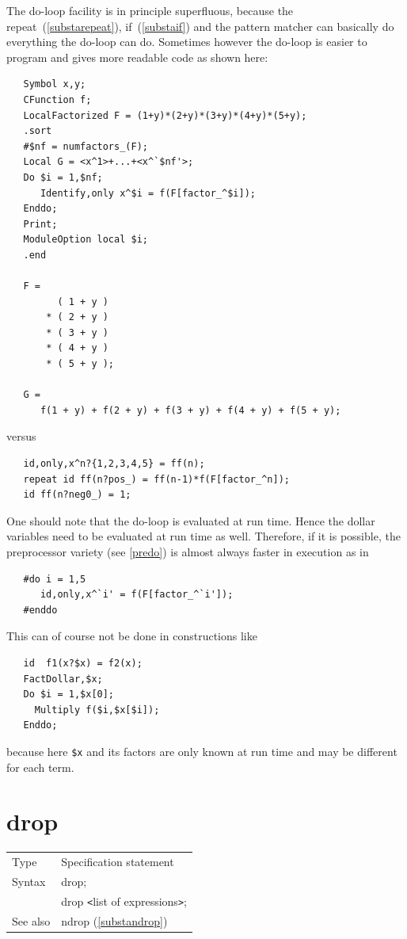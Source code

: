 \noindent The do-loop facility is in principle superfluous, because the 
repeat~(\ref{substarepeat}), if~(\ref{substaif}) and the pattern matcher can 
basically do everything the do-loop can do. Sometimes however the do-loop 
is easier to program and gives more readable code as shown here:
\begin{verbatim}
   Symbol x,y;
   CFunction f;
   LocalFactorized F = (1+y)*(2+y)*(3+y)*(4+y)*(5+y);
   .sort
   #$nf = numfactors_(F);
   Local G = <x^1>+...+<x^`$nf'>;
   Do $i = 1,$nf;
      Identify,only x^$i = f(F[factor_^$i]);
   Enddo;
   Print;
   ModuleOption local $i;
   .end

   F =
         ( 1 + y )
       * ( 2 + y )
       * ( 3 + y )
       * ( 4 + y )
       * ( 5 + y );

   G =
      f(1 + y) + f(2 + y) + f(3 + y) + f(4 + y) + f(5 + y);
\end{verbatim}
\noindent versus
\begin{verbatim}
   id,only,x^n?{1,2,3,4,5} = ff(n);
   repeat id ff(n?pos_) = ff(n-1)*f(F[factor_^n]);
   id ff(n?neg0_) = 1;
\end{verbatim}
\noindent One should note that the do-loop is evaluated at run time. Hence 
the dollar variables need to be evaluated at run time as well. Therefore, 
if it is possible, the preprocessor variety (see \ref{predo}) is almost 
always faster in execution as in
\begin{verbatim}
   #do i = 1,5
      id,only,x^`i' = f(F[factor_^`i']);
   #enddo
\end{verbatim}
\noindent This can of course not be done in constructions like
\begin{verbatim}
   id  f1(x?$x) = f2(x);
   FactDollar,$x;
   Do $i = 1,$x[0];
     Multiply f($i,$x[$i]);
   Enddo;
\end{verbatim}
\noindent because here \verb:$x: and its factors are only known at run time 
and may be different for each term.
\vspace{10mm}


\section{drop}
\label{substadrop}

\noindent \begin{tabular}{ll}
Type & Specification statement\\
Syntax & drop; \\
       & drop {\tt<}list of expressions{\tt>};
\\ See also & ndrop (\ref{substandrop})
\end{tabular} \vspace{4mm}

